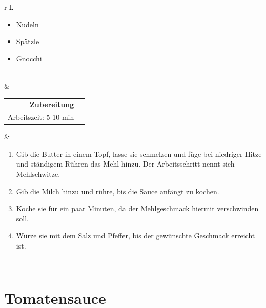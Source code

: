\documentclass[a4paper, 12pt]{scrbook} 								%
\numberwithin{equation}{section} 									%
\begin{document}
\begin{tabularx}{\textwidth}{r|L}
\begin{itemize}[]
										\item Nudeln
										\item Spätzle
										\item Gnocchi
									\end{itemize}	\\
								&	\\	
		\begin{tabular}[t]{rr}
			\textbf{Zubereitung}	\\
			Arbeitszeit: 5-10 min		\\
		\end{tabular}			&	\begin{enumerate}[]
										\item Gib die Butter in einem Topf, lasse sie schmelzen und füge bei niedriger Hitze und ständigem Rühren das Mehl hinzu. Der Arbeitsschritt nennt sich Mehlschwitze.
										\item Gib die Milch hinzu und rühre, bis die Sauce anfängt zu kochen.
										\item Koche sie für ein paar Minuten, da der Mehlgeschmack hiermit verschwinden soll.
										\item Würze sie mit dem Salz und Pfeffer, bis der gewünschte Geschmack erreicht ist. 
									\end{enumerate}	\\
	\end{tabularx}
	\newpage


	\section{Tomatensauce}	\label{tomatensauce}
\end{document}
